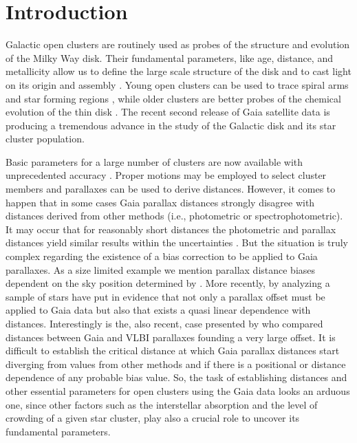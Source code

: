 \documentclass[draft]{aa}
\begin{document}

\maketitle




\section{Introduction}

Galactic open clusters are routinely used as probes of the structure and
evolution of the Milky Way disk. Their fundamental parameters, like age,
distance, and metallicity allow us to define the large scale structure of the
disk and to cast light on its origin and assembly \citep{Janes_1982,
Moitinho_2010,2018A&A...618A..93C}. Young open clusters can be used to trace
spiral arms and star forming regions \citep{Moitinho_2006,Vazquez2008}, while
older clusters are better probes of the chemical evolution of the thin disk
\citep{2009yCat..35120063M}. The recent second release of Gaia satellite data
\citep{GaiaDR2_2018} is producing a tremendous advance in the study of the
Galactic disk and its star cluster population.

Basic parameters for a large number of clusters are now available with
unprecedented accuracy \citep{2018A&A...618A..93C,Soubiran_2018,Bossini_2019}.
Proper motions may be employed to select cluster members and parallaxes can be
used to derive distances. However, it comes to happen that in some cases Gaia
parallax distances strongly disagree with distances derived from other methods 
(i.e., photometric or spectrophotometric). It may occur that for reasonably
short distances the photometric and parallax distances yield similar results
within the uncertainties \citep{2018A&A...618A..93C}. But the situation is
truly complex regarding the existence of a bias correction to be applied to
Gaia parallaxes. As a size limited example we mention parallax distance biases
dependent on the sky position determined by \cite{Lindegren_2018}. More
recently, by analyzing a sample of stars \cite{Schonrich2019} have put in
evidence that not only a parallax offset must be applied to Gaia data but also
that exists a quasi linear dependence with distances. Interestingly is the,
also recent, case presented by \cite{Xu_2019} who compared distances between
Gaia and VLBI parallaxes founding a very large offset. 
It is difficult to establish the critical distance at which Gaia parallax
distances start diverging from values from other methods and if there is a
positional or distance dependence of any probable bias value. So, the  task of
establishing distances and other essential parameters for open clusters using
the Gaia data looks an arduous one, since other factors such as the
interstellar absorption and the level of crowding of a given star cluster, play
also a crucial role to uncover its fundamental parameters.
\end{document}
